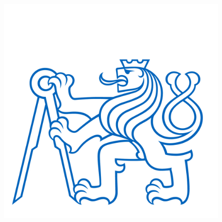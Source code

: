 \thispagestyle{empty}

\begin{center}
    {\Large \bf \cvut\\[2mm] \fjfi\\ }
    \vspace{3mm}
    
    {\large \bf \kdaiz}\\
     \vspace{2mm}  
   
   \vspace{0mm}

\begin{figure}[h]
\begin{center}
	\includegraphics[scale=1.5]{cvut.jpg}
\end{center}
\end{figure}

    \vspace{5mm}


   \vspace{0mm}
   {\Huge\textbf{\MakeUppercase{\typprace}}}

   \vspace{15mm}
   {\Large \textbf{\nazevcz}}
   
\end{center}

